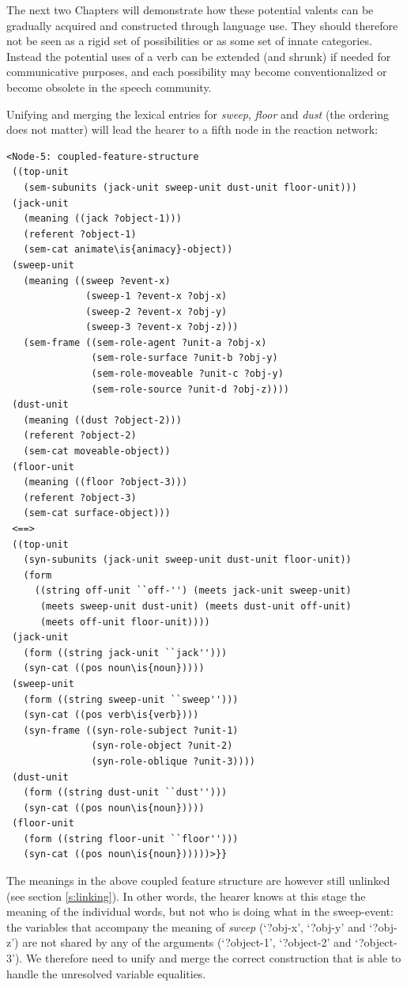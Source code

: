 The next two Chapters will demonstrate how these potential valents can be gradually acquired and constructed through language use. They should therefore not be seen as a rigid set of possibilities or as some set of innate categories. Instead the potential uses of a verb can be extended (and shrunk) if needed for communicative purposes, and each possibility may become conventionalized or become obsolete in the speech community.

Unifying and merging the lexical entries for {\em sweep}, {\em floor} and {\em dust} (the ordering does not matter) will lead the hearer to a fifth node in the reaction network:


\ea
\begin{lstlisting}
<Node-5: coupled-feature-structure
 ((top-unit
   (sem-subunits (jack-unit sweep-unit dust-unit floor-unit)))
 (jack-unit
   (meaning ((jack ?object-1)))
   (referent ?object-1)
   (sem-cat animate\is{animacy}-object))
 (sweep-unit
   (meaning ((sweep ?event-x)
              (sweep-1 ?event-x ?obj-x)
              (sweep-2 ?event-x ?obj-y)
              (sweep-3 ?event-x ?obj-z)))
   (sem-frame ((sem-role-agent ?unit-a ?obj-x)
               (sem-role-surface ?unit-b ?obj-y)
               (sem-role-moveable ?unit-c ?obj-y)
               (sem-role-source ?unit-d ?obj-z))))
 (dust-unit
   (meaning ((dust ?object-2)))
   (referent ?object-2)
   (sem-cat moveable-object))
 (floor-unit
   (meaning ((floor ?object-3)))
   (referent ?object-3)
   (sem-cat surface-object)))
 <==>
 ((top-unit
   (syn-subunits (jack-unit sweep-unit dust-unit floor-unit))
   (form 
     ((string off-unit ``off-'') (meets jack-unit sweep-unit)
      (meets sweep-unit dust-unit) (meets dust-unit off-unit)  
      (meets off-unit floor-unit))))
 (jack-unit
   (form ((string jack-unit ``jack'')))
   (syn-cat ((pos noun\is{noun}))))
 (sweep-unit
   (form ((string sweep-unit ``sweep'')))
   (syn-cat ((pos verb\is{verb})))
   (syn-frame ((syn-role-subject ?unit-1)
               (syn-role-object ?unit-2)
               (syn-role-oblique ?unit-3))))
 (dust-unit
   (form ((string dust-unit ``dust'')))
   (syn-cat ((pos noun\is{noun}))))
 (floor-unit
   (form ((string floor-unit ``floor'')))
   (syn-cat ((pos noun\is{noun})))))>}}

\end{lstlisting}
\z

The meanings in the above coupled feature structure are however still unlinked (see section \ref{s:linking}). In other words, the hearer knows at this stage the meaning of the individual words, but not who is doing what in the sweep-event: the variables that accompany the meaning of {\em sweep} (`?obj-x', `?obj-y' and `?obj-z') are not shared by any of the arguments (`?object-1', `?object-2' and `?object-3'). We therefore need to unify and merge the correct construction that is able to handle the unresolved variable equalities.

